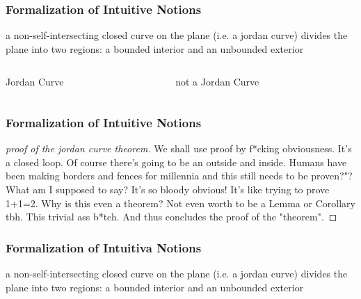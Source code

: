 \documentclass{beamer}
\begin{document}
\begin{frame}[label=jordan]
    \frametitle{Formalization of Intuitive Notions}

    \begin{theorem}
        a non-self-intersecting closed curve on the plane (i.e. a jordan curve) divides the plane into
        two regions: a bounded interior and an unbounded exterior
    \end{theorem}
    \pause
    \begin{columns}
        \begin{column}{0.48\textwidth}
            \begin{block}{Jordan Curve}
                \vspace*{3cm}
            \end{block}
        \end{column}
        \begin{column}{0.48\textwidth}
            \begin{block}{not a Jordan Curve}
                \vspace{3cm}
            \end{block}
        \end{column}
    \end{columns}

\end{frame}

\begin{frame}
    \frametitle{Formalization of Intuitive Notions}

    \begin{proof}[proof of the jordan curve theorem]
        We shall use proof by f*cking obviousness. It's a closed loop. Of course there's going to be an outside and inside. 
        Humans have been making borders and fences for millennia and this still needs to be proven?"? What am I supposed to say?
        It's so bloody obvious! 
        It's like trying to prove 1+1=2. Why is this even a theorem? Not even worth to be a Lemma or Corollary tbh. 
        This trivial ass b*tch.
        And thus concludes the proof of the "theorem".
    \end{proof}

\end{frame}

\begin{frame}
    \frametitle{Formalization of Intuitiva Notions}

    \begin{theorem}
        a non-self-intersecting closed curve on the plane (i.e. a jordan curve) divides the plane into
        two regions: a bounded interior and an unbounded exterior
    \end{theorem}

\end{frame}
\end{document}
